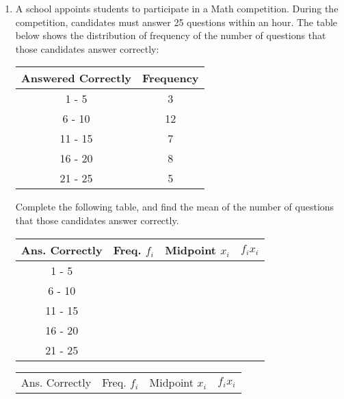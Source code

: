\documentclass{report}
\begin{document}
\begin{multicols}{2}
\begin{enumerate}
    \item A school appoints students to participate in a Math competition. During the
          competition, candidates must answer 25 questions within an hour. The table
          below shows the distribution of frequency of the number of questions that those
          candidates answer correctly:
          \begin{center}
            \begin{tabular}{|c|c|}
              \hline
              Answered Correctly & Frequency \\
              \hline
              1 - 5              & 3         \\
              6 - 10             & 12        \\
              11 - 15            & 7         \\
              16 - 20            & 8         \\
              21 - 25            & 5         \\
              \hline
            \end{tabular}
          \end{center}
          Complete the following table, and find the mean of the number of questions that those candidates answer correctly.
          \begin{center}
            \begin{tabular}{|c|c|c|c|}
              \hline
              Ans. Correctly & Freq. $f_i$ & Midpoint $x_i$ & $f_ix_i$ \\
              \hline
              1 - 5          &             &                &          \\
              6 - 10         &             &                &          \\
              11 - 15        &             &                &          \\
              16 - 20        &             &                &          \\
              21 - 25        &             &                &          \\
              \hline
            \end{tabular}
          \end{center}
          \sol{}
          \begin{center}
            \begin{tabular}{|c|c|c|c|}
              \hline
              Ans. Correctly & Freq. $f_i$     & Midpoint $x_i$       & $f_ix_i$ \\

\end{tabular}
\end{center}
\end{enumerate}
\end{multicols}
\end{document}
